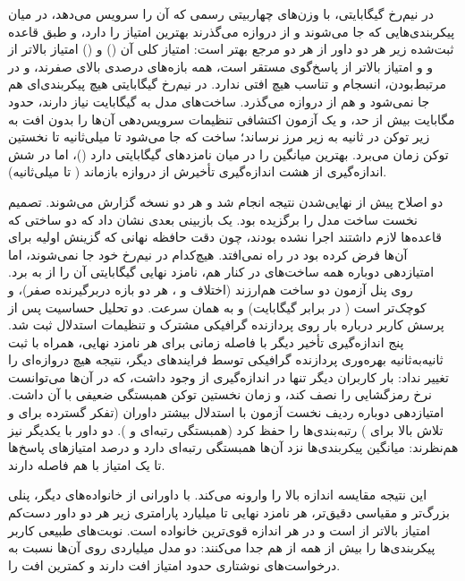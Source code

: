 در نیم‌رخ  گیگابایتی،  با وزن‌های چهاربیتی رسمی  که
 آن را سرویس می‌دهد، در میان پیکربندی‌هایی که جا می‌شوند و از دروازه می‌گذرند
بهترین امتیاز را دارد، و طبق قاعده ثبت‌شده زیر هر دو داور از هر دو مرجع بهتر است:
امتیاز کلی آن  () و  () امتیاز بالاتر از
 و  و  امتیاز بالاتر از پاسخ‌گوی مستقر است، همه
بازه‌های  درصدی بالای صفرند، و در مرتبط‌بودن، انسجام و تناسب هیچ افتی ندارد. در
نیم‌رخ  گیگابایتی هیچ پیکربندی‌ای هم جا نمی‌شود و هم از دروازه می‌گذرد. ساخت‌های
 مدل  به  گیگابایت نیاز دارند، حدود  مگابایت
بیش از حد، و یک آزمون اکتشافی تنظیمات سرویس‌دهی آن‌ها را بدون افت به زیر  توکن در
ثانیه به زیر مرز نرساند؛ ساخت  که جا می‌شود  تا 
میلی‌ثانیه تا نخستین توکن زمان می‌برد.  بهترین میانگین را در میان
نامزدهای  گیگابایتی دارد ()، اما در شش اندازه‌گیری از هشت اندازه‌گیری
تأخیرش از دروازه بازماند ( تا  میلی‌ثانیه).

دو اصلاح پیش از نهایی‌شدن نتیجه انجام شد و هر دو نسخه گزارش می‌شوند. تصمیم نخست ساخت
 مدل  را برگزیده بود. یک بازبینی بعدی نشان داد که دو ساختی که
قاعده‌ها لازم داشتند اجرا نشده بودند، چون دقت حافظه نهانی که گزینش اولیه برای آن‌ها فرض
کرده بود در  راه نمی‌افتد. هیچ‌کدام در نیم‌رخ خود جا نمی‌شوند، اما
امتیازدهی دوباره همه ساخت‌های  در کنار هم، نامزد نهایی 
گیگابایتی آن را از  به  برد. روی پنل آزمون دو ساخت هم‌ارزند (اختلاف
 و ، هر دو بازه دربرگیرنده صفر)، و  کوچک‌تر است (
در برابر  گیگابایت) و به همان سرعت. دو تحلیل حساسیت پس از پرسش کاربر درباره
بار روی پردازنده گرافیکی مشترک و تنظیمات استدلال ثبت شد. پنج اندازه‌گیری تأخیر دیگر با
فاصله زمانی برای هر نامزد نهایی، همراه با ثبت ثانیه‌به‌ثانیه بهره‌وری پردازنده گرافیکی
توسط فرایندهای دیگر، نتیجه هیچ دروازه‌ای را تغییر نداد: بار کاربران دیگر تنها در 
اندازه‌گیری از  وجود داشت، که در آن‌ها می‌توانست نرخ رمزگشایی را نصف کند، و زمان
نخستین توکن همبستگی ضعیفی با آن داشت. امتیازدهی دوباره  ردیف نخست آزمون با استدلال
بیشتر داوران (تفکر گسترده برای  و تلاش بالا برای ) رتبه‌بندی‌ها را حفظ
کرد (همبستگی رتبه‌ای  و ). دو داور با یکدیگر نیز هم‌نظرند: میانگین
پیکربندی‌ها نزد آن‌ها همبستگی رتبه‌ای  دارد و  درصد امتیازهای پاسخ‌ها
تا یک امتیاز با هم فاصله دارند.

این نتیجه مقایسه اندازه بالا را وارونه می‌کند. با داورانی از خانواده‌های دیگر، پنلی
بزرگ‌تر و مقیاسی دقیق‌تر، هر نامزد نهایی  تا  میلیارد پارامتری زیر هر دو
داور دست‌کم  امتیاز بالاتر از  است و  در هر اندازه
قوی‌ترین خانواده است. نوبت‌های طبیعی کاربر پیکربندی‌ها را بیش از همه از هم جدا می‌کنند:
دو مدل  میلیاردی  روی آن‌ها نسبت به درخواست‌های نوشتاری حدود 
امتیاز افت دارند و  کمترین افت را.

